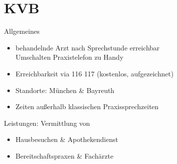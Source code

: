 \section{KVB}
\begin{sectionbox}{Allgemeines}
    \begin{itemize}
        \item behandelnde Arzt nach Sprechstunde erreichbar\\
        \ra Umschalten Praxistelefon zu Handy
        \item Erreichbarkeit via 116 117 (kostenlos, aufgezeichnet)
        \item Standorte: München \& Bayreuth
        \item Zeiten außerhalb klassischen Praxissprechzeiten
    \end{itemize}
\end{sectionbox}
\begin{sectionbox}{Leistungen: Vermittlung von}
    \begin{itemize}
        \item Hausbesuchen  \& Apothekendienst
        \item Bereitschaftspraxen \& Fachärzte
    \end{itemize}
\end{sectionbox}
